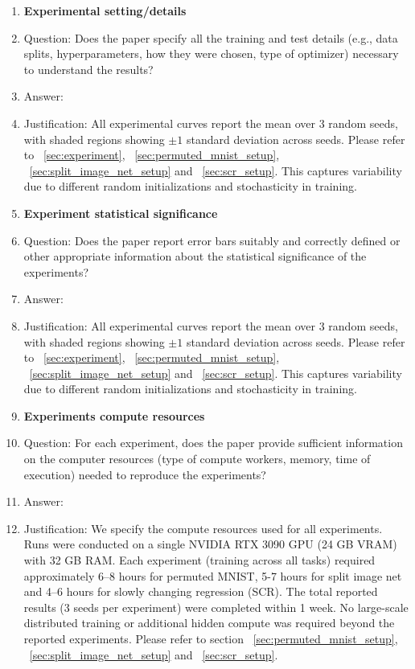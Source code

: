 \begin{enumerate}
\item {\bf Experimental setting/details}
    \item[] Question: Does the paper specify all the training and test details (e.g., data splits, hyperparameters, how they were chosen, type of optimizer) necessary to understand the results?
    \item[] Answer: \answerYes{} %
    \item[] Justification: All experimental curves report the mean over 3 random seeds, with shaded regions showing $\pm 1$ standard deviation across seeds. Please refer to ~\ref{sec:experiment}, ~\ref{sec:permuted_mnist_setup}, ~\ref{sec:split_image_net_setup} and ~\ref{sec:scr_setup}.
    This captures variability due to different random initializations and stochasticity in training.  

\item {\bf Experiment statistical significance}
    \item[] Question: Does the paper report error bars suitably and correctly defined or other appropriate information about the statistical significance of the experiments?
    \item[] Answer:  \answerYes{} %
    \item[] Justification: All experimental curves report the mean over 3 random seeds, with shaded regions showing $\pm 1$ standard deviation across seeds. Please refer to ~\ref{sec:experiment}, ~\ref{sec:permuted_mnist_setup}, ~\ref{sec:split_image_net_setup} and ~\ref{sec:scr_setup}.
    This captures variability due to different random initializations and stochasticity in training.  

\item {\bf Experiments compute resources}
    \item[] Question: For each experiment, does the paper provide sufficient information on the computer resources (type of compute workers, memory, time of execution) needed to reproduce the experiments?
    \item[] Answer:\answerYes{}%
    \item[] Justification: We specify the compute resources used for all experiments. Runs were conducted on a single NVIDIA RTX 3090 GPU (24 GB VRAM) with 32 GB RAM. Each experiment (training across all tasks) required approximately 6–8 hours for permuted MNIST, 5-7 hours for split image net and 4–6 hours for slowly changing regression (SCR). The total reported results (3 seeds per experiment) were completed within 1 week. No large-scale distributed training or additional hidden compute was required beyond the reported experiments. Please refer to section ~\ref{sec:permuted_mnist_setup}, ~\ref{sec:split_image_net_setup} and ~\ref{sec:scr_setup}.
    

\end{enumerate}
